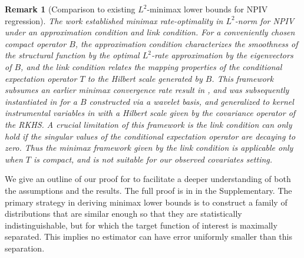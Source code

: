 \documentclass[11pt]{article}
\newcommand{\0}{\mathbf{0}}
\newtheorem{rem}{Remark}[section]
\begin{document}
\begin{rem}[Comparison to existing $L^2$-minimax lower bounds for NPIV regression]
The work \citet{chen2011rate} established minimax rate-optimality in $L^2$-norm for NPIV under an \emph{approximation condition} and \emph{link condition}. For a conveniently chosen compact operator $B$, the approximation condition characterizes the smoothness of the structural function by the optimal $L^2$-rate approximation by the eigenvectors of $B$, and the link condition relates the mapping properties of the conditional expectation operator $T$ to the Hilbert scale generated by $B$. This framework subsumes an earlier minimax convergence rate result in \citet{HallHorowitz2005}, and was subsequently instantiated in \citet{Chen_2018} for a $B$ constructed via a wavelet basis, and generalized to kernel instrumental variables in  \citet{meunier2024nonparametricinstrumentalregressionkernel} with a Hilbert scale given by the covariance operator of the RKHS. A crucial limitation of this framework is the link condition can only hold if the singular values of the conditional expectation operator are decaying to zero. Thus the minimax framework given by the link condition is applicable only when $T$ is compact, and is not suitable for our observed covariates setting. 
\end{rem}

We give an outline of our proof for  to facilitate a deeper
understanding of both the assumptions and the results. The full proof is in  in the Supplementary. The primary strategy in deriving minimax lower bounds is to construct a family of distributions that are similar enough so that they are statistically indistinguishable, but for which the target function of interest is maximally separated. 
This implies no estimator can have error uniformly smaller than this separation. 
\end{document}
